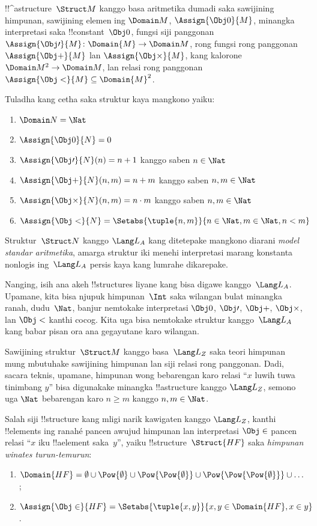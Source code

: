 \documentclass[../../../include/open-logic-section]{subfiles}
\begin{document}
\begin{ex}
!!^a{structure}~$\Struct M$ kanggo basa aritmetika dumadi saka
sawijining himpunan, sawijining elemen ing $\Domain M$,
$\Assign{\Obj 0}{M}$, minangka interpretasi saka !!{constant}~$\Obj 0$,
fungsi siji panggonan $\Assign{\Obj \prime}{M} \colon \Domain{M} \to
\Domain M$, rong fungsi rong panggonan $\Assign{\Obj +}{M}$ lan
$\Assign{\Obj \times}{M}$, kang kalorone $\Domain M^2 \to \Domain M$,
lan relasi rong panggonan $\Assign{\Obj <}{M} \subseteq \Domain{M}^2$.

Tuladha kang cetha saka struktur kaya mangkono yaiku:
\begin{enumerate}
\item $\Domain N = \Nat$
\item $\Assign{\Obj 0}{N} = 0$
\item $\Assign{\Obj \prime}{N}(n) = n + 1$ kanggo saben $n \in \Nat$
\item $\Assign{\Obj +}{N}(n, m) = n + m$ kanggo saben $n, m \in \Nat$
\item $\Assign{\Obj \times}{N}(n, m) = n\cdot m$ kanggo saben $n, m \in \Nat$
\item $\Assign{\Obj <}{N} = \Setabs{\tuple{n, m}}{n \in \Nat, m \in
  \Nat, n < m}$
\end{enumerate}
Struktur~$\Struct N$ kanggo $\Lang L_A$ kang ditetepake mangkono
diarani \emph{model standar aritmetika}, amarga struktur iki menehi
interpretasi marang konstanta nonlogis ing~$\Lang L_A$ persis kaya
kang lumrahe dikarepake.

Nanging, isih ana akeh !!{structure}s liyane kang bisa digawe
kanggo~$\Lang L_A$. Upamane, kita bisa njupuk himpunan~$\Int$
saka wilangan bulat minangka ranah, dudu~$\Nat$, banjur nemtokake
interpretasi $\Obj 0$, $\Obj \prime$, $\Obj +$, $\Obj \times$, lan
$\Obj <$ kanthi cocog. Kita uga bisa nemtokake struktur kanggo~$\Lang L_A$
kang babar pisan ora ana gegayutane karo wilangan.
\end{ex}

\begin{ex}
Sawijining struktur~$\Struct M$ kanggo basa~$\Lang L_Z$ saka teori
himpunan mung mbutuhake sawijining himpunan lan siji relasi rong
panggonan. Dadi, sacara teknis, upamane, himpunan wong bebarengan
karo relasi ``$x$ luwih tuwa tinimbang $y$'' bisa digunakake minangka
!!a{structure} kanggo $\Lang L_Z$, semono uga $\Nat$ bebarengan
karo $n \ge m$ kanggo $n, m \in \Nat$.

Salah siji !!{structure} kang mligi narik kawigaten kanggo $\Lang L_Z$,
kanthi !!{element}s ing ranahé pancen awujud himpunan lan interpretasi
$\Obj \in$ pancen relasi ``$x$ iku !!a{element} saka~$y$'', yaiku
!!{structure}~$\Struct{{HF}}$ saka \emph{himpunan winates turun-temurun}:
\begin{enumerate}
\item $\Domain{{{HF}}} = \emptyset \cup \Pow{\emptyset} \cup
  \Pow{\Pow{\emptyset}} \cup \Pow{\Pow{\Pow{\emptyset}}} \cup \dots$;
\item $\Assign{\Obj \in}{{{HF}}} = \Setabs{\tuple{x, y}}{x, y \in
  \Domain{{{HF}}}, x \in y}$.
\end{enumerate}
\end{ex}
\end{document}
